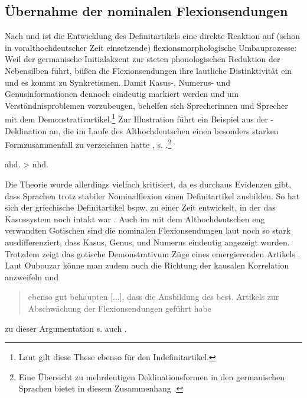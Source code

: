 \subsection{Übernahme der nominalen Flexionsendungen} \label{sec:flexion} 

Nach \textcite[168--170]{Tschirch1983} und \textcite[13]{vonPolenz2009} ist die Entwicklung des Definitartikels eine direkte Reaktion auf (schon in voralthochdeutscher Zeit einsetzende) flexionsmorphologische Umbauprozesse: Weil der germanische Initialakzent zur steten phonologischen Reduktion der Nebensilben führt, büßen die Flexionsendungen ihre lautliche Distinktivität ein und es kommt zu Synkretismen. Damit Kasus-, Numerus- und Genusinformationen dennoch eindeutig markiert werden und um Verständnisproblemen vorzubeugen, behelfen sich Sprecherinnen und Sprecher mit dem Demonstrativartikel.\footnote{Laut \textcite[70]{Schildt1981} gilt diese These ebenso für den Indefinitartikel.} Zur Illustration führt \textcite[13]{vonPolenz2009} ein Beispiel aus der -Deklination an, die im Laufe des Althochdeutschen einen besonders starken Formzusammenfall zu verzeichnen hatte \parencite[248]{Meineke2001}, s. .\footnote{Eine Übersicht zu mehrdeutigen Deklinationsformen in den germanischen Sprachen bietet in diesem Zusammenhang \textcite[48--51]{Heinrichs1954}.} 
 
\begin{exe}
	\ex \label{ex:flexion}   
	ahd.  > nhd. 
\end{exe}

Die Theorie wurde allerdings vielfach kritisiert, da es durchaus Evidenzen gibt, dass Sprachen trotz stabiler Nominalflexion einen Definitartikel ausbilden. So hat sich der griechische Definitartikel bspw. zu einer Zeit entwickelt, in der das Kasussystem noch intakt war \parencite[44]{Ebert1978}. 
Auch im mit dem Althochdeutschen eng verwandten Gotischen sind die nominalen Flexionsendungen laut \textcite[10]{Kovari1984} noch so stark ausdifferenziert, dass Kasus, Genus, und Numerus eindeutig angezeigt wurden. Trotzdem zeigt das gotische Demonstrativum Züge eines emergierenden Artikels \parencite[vgl.][114--155]{Leiss2000}. Laut Oubouzar könne man zudem auch die Richtung der kausalen Korrelation anzweifeln und \blockcquote[71]{Oubouzar1992}{ebenso gut behaupten
[...], dass die Ausbildung des best. Artikels zur Abschwächung der Flexionsendungen geführt habe}; zu dieser Argumentation s. auch \textcite[51]{Heinrichs1954}.  

